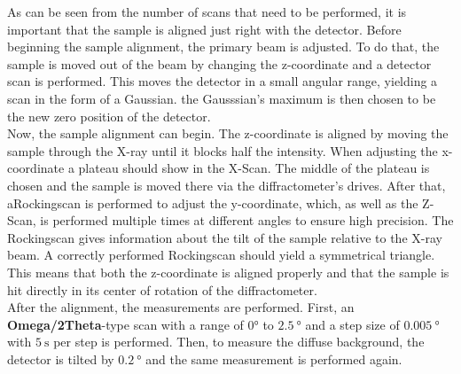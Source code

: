 As can be seen from the number of scans that need to be performed, it is important that the sample is aligned just right with the detector.
Before beginning the sample alignment, the primary beam is adjusted.
To do that, the sample is moved out of the beam by changing the z-coordinate and a detector scan is performed.
This moves the detector in a small angular range, yielding a scan in the form of a Gaussian.
the Gausssian's maximum is then chosen to be the new zero position of the detector. \\
Now, the sample alignment can begin.
The z-coordinate is aligned by moving the sample through the X-ray until it blocks half the intensity.
When adjusting the x-coordinate a plateau should show in the X-Scan.
The middle of the plateau is chosen and the sample is moved there via the diffractometer's drives.
After that, aRockingscan is performed to adjust the y-coordinate, which, as well as the Z-Scan, is performed multiple times at
different angles to ensure high precision.
The Rockingscan gives information about the tilt of the sample relative to the X-ray beam.
A correctly performed Rockingscan should yield a symmetrical triangle.
This means that both the z-coordinate is aligned properly and that the sample is hit directly in its center of rotation of the diffractometer. \\

After the alignment, the measurements are performed.
First, an \textbf{Omega/2Theta}-type scan with a range of $0°$ to $\SI{2.5}{\degree}$ and a step size of $\SI{0.005}{\degree}$ with $\SI{5}{\second}$ per step is performed.
Then, to measure the diffuse background, the detector is tilted by $\SI{0.2}{\degree}$ and the same measurement is performed again.


